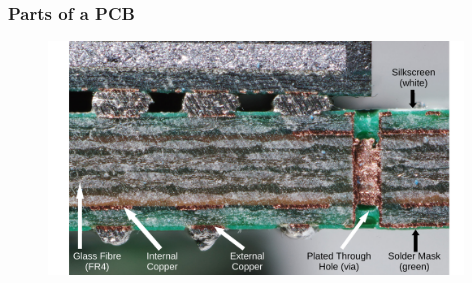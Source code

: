 \documentclass[aspectratio=169, t]{beamer}
\begin{document}
\begin{frame}
	\frametitle{Parts of a PCB}
	\begin{figure}
		\includegraphics[width=11cm]{images/pcb-cross-section-markup.pdf}

	\end{figure}
\end{frame}
\end{document}
